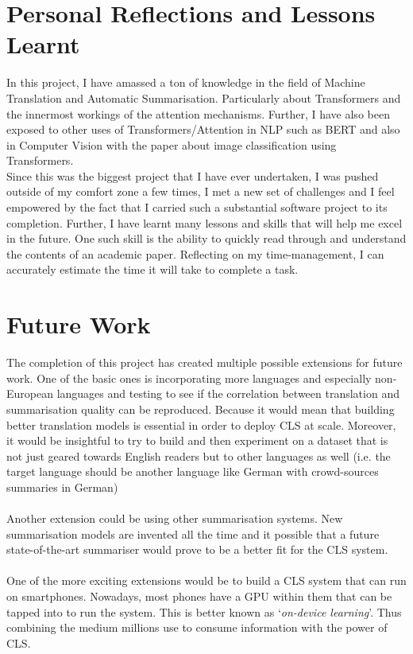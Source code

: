 \documentclass[12pt,a4paper,twoside,openright]{report}
\newcommand{\red}[1]{\textcolor{red}{#1}}
\newcommand{\todo}[1]{\red{\textbf{TODO}: #1}}
\begin{document}
\section*{Personal Reflections and Lessons Learnt}
\label{reflection-and-lessons}

In this project, I have amassed a ton of knowledge in the field of Machine Translation and Automatic Summarisation. Particularly about Transformers and the innermost workings of the attention mechanisms. Further, I have also been exposed to other uses of Transformers/Attention in NLP such as BERT\cite{bert} and also in Computer Vision with the paper\cite{cv}  about image classification using Transformers.
\newpage
\phantom{.}\\
Since this was the biggest project that I have ever undertaken, I was pushed outside of my comfort zone a few times, I met a new set of challenges and I feel empowered by the fact that I carried such a substantial software project to its completion.
Further, I have learnt many lessons and skills that will help me excel in the future. One such skill is the ability to quickly read through and understand the contents of an academic paper.
Reflecting on my time-management, I can accurately estimate the time it will take to complete a task.



\section*{Future Work}
\label{future-work}


The completion of this project has created multiple possible extensions for future work.
One of the basic ones is incorporating more languages and especially non-European languages and testing to see if the correlation between translation and summarisation quality can be reproduced. Because it would mean that building better translation models is essential in order to deploy CLS at scale. Moreover, it would be insightful to try to build and then experiment on a dataset that is not just geared towards English readers but to other languages as well (i.e. the target language should be another language like German with crowd-sources summaries in German)
\\\\
Another extension could be using other summarisation systems. New summarisation models are invented all the time and it possible that a future state-of-the-art summariser would prove to be a better fit for the CLS system.
\\\\
One of the more exciting extensions would be to build a CLS system that can run on smartphones. Nowadays, most phones have a GPU within them that can be tapped into to run the system. This is better known as `\textit{on-device learning}'. Thus combining the medium millions use to consume information with the power of CLS.
\end{document}
